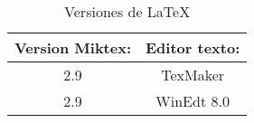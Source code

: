 \begin{table}[!ht]
\begin{center}

		\begin{tabular}{|c||c||}
          \hline
          \rowcolor[RGB]{0,88,147} Version Miktex: &  Editor texto: \\ \hline\hline
           2.9 & TexMaker   \\ \hline
         2.9 & WinEdt 8.0    \\ \hline
        \end{tabular}

\end{center}
        \caption{Versiones de \LaTeX{}}
        \label{marca:1}
\end{table} 